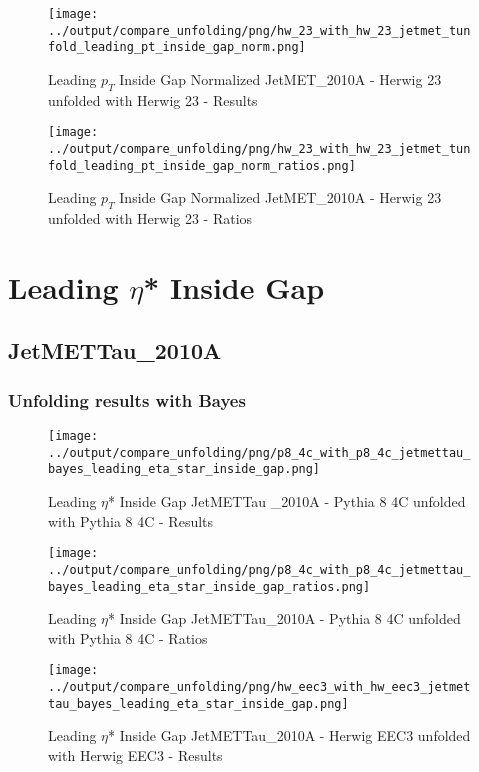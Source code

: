 \documentclass[11pt]{book}
\begin{document}
\begin{figure}[ht]
\centering
\texttt{[image: ../output/compare\_unfolding/png/hw\_23\_with\_hw\_23\_jetmet\_tunfold\_leading\_pt\_inside\_gap\_norm.png]}
\caption{Leading $p_{T}$ Inside Gap Normalized JetMET\_2010A - Herwig 23 unfolded with Herwig 23 - Results}
\label{hw_23_hw_23_jetmet_tunfold_leading_pt_inside_gap_norm_a}
\end{figure}

\begin{figure}[ht]
\centering
\texttt{[image: ../output/compare\_unfolding/png/hw\_23\_with\_hw\_23\_jetmet\_tunfold\_leading\_pt\_inside\_gap\_norm\_ratios.png]}
\caption{Leading $p_{T}$ Inside Gap Normalized JetMET\_2010A - Herwig 23 unfolded with Herwig 23 - Ratios}
\label{hw_23_hw_23_jetmet_tunfold_leading_pt_inside_gap_norm_b}
\end{figure}




\newpage
\chapter{Leading $\eta$* Inside Gap}
\section{JetMETTau\_2010A}
\subsection{Unfolding results with Bayes}


\begin{figure}[ht]
\centering
\texttt{[image: ../output/compare\_unfolding/png/p8\_4c\_with\_p8\_4c\_jetmettau\_bayes\_leading\_eta\_star\_inside\_gap.png]}
\caption{Leading $\eta$* Inside Gap JetMETTau \_2010A - Pythia 8 4C unfolded with Pythia 8 4C - Results}
\label{p8_p8_jetmettau_bayes_leading_eta_star_inside_gap_a}
\end{figure}

\begin{figure}[ht]
\centering
\texttt{[image: ../output/compare\_unfolding/png/p8\_4c\_with\_p8\_4c\_jetmettau\_bayes\_leading\_eta\_star\_inside\_gap\_ratios.png]}
\caption{Leading $\eta$* Inside Gap JetMETTau\_2010A - Pythia 8 4C unfolded with Pythia 8 4C - Ratios}
\label{p8_p8_jetmettau_bayes_leading_eta_star_inside_gap_b}
\end{figure}

\begin{figure}[ht]
\centering
\texttt{[image: ../output/compare\_unfolding/png/hw\_eec3\_with\_hw\_eec3\_jetmettau\_bayes\_leading\_eta\_star\_inside\_gap.png]}
\caption{Leading $\eta$* Inside Gap JetMETTau\_2010A - Herwig EEC3 unfolded with Herwig EEC3 - Results}
\label{hw_eec3_hw_eec3_jetmettau_bayes_leading_eta_star_inside_gap_a}
\end{figure}
\end{document}

